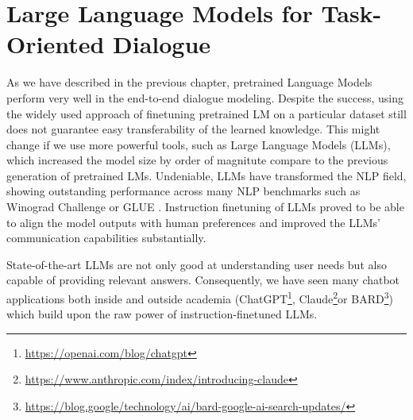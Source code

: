 \chapter{Large Language Models for Task-Oriented Dialogue}
\label{chap:llms}

\label{07:sec:intro}
As we have described in the previous chapter, pretrained Language Models perform very well in the end-to-end dialogue modeling.
Despite the success, using the widely used approach of finetuning pretrained LM on a particular dataset still does not guarantee easy transferability of the learned knowledge.
This might change if we use more powerful tools, such as 
Large Language Models (LLMs), which increased the model size by order of magnitute compare to the previous generation of pretrained LMs.
Undeniable, LLMs have transformed the NLP field,
showing outstanding performance across many NLP benchmarks such as Winograd Challenge \cite{levesque2012winograd} or GLUE \cite{wang2018glue}.
Instruction finetuning of LLMs proved to be able to align the model outputs with human preferences \cite{ouyang2022training,supernaturalinstructions} and improved the LLMs' communication capabilities substantially.

State-of-the-art LLMs are not only good at understanding user needs but also capable of providing relevant answers.
Consequently, we have seen many chatbot applications both inside and outside academia (ChatGPT\footnote{\url{https://openai.com/blog/chatgpt}}, Claude\footnote{\url{https://www.anthropic.com/index/introducing-claude}}or BARD\footnote{\url{https://blog.google/technology/ai/bard-google-ai-search-updates/}}) which build upon the raw power of instruction-finetuned LLMs.

